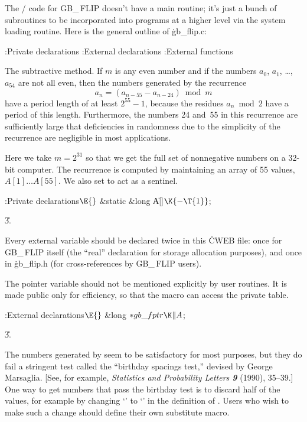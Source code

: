 The \CEE/ code for {\sc GB\_\,FLIP} doesn't have a main routine; it's just
a
bunch of subroutines to be incorporated into programs at a higher level
via the system loading routine. Here is the general outline of \.{gb\_flip.c}:

\Y\B{}:Private declarations\X\6
:External declarations\X\6
:External functions\X\par
\fi

The subtractive method. If $m$ is any even number and if the
numbers $a_0$, $a_1$, \dots,~$a_{54}$ are not all even, then the numbers
generated by the recurrence
$$ a_n=(a_{n-55}-a_{n-24})\bmod m $$
have a period length of at least $2^{55}-1$, because the residues
$a_n\bmod2$ have a period of this length. Furthermore, the numbers 24 and~55
in this recurrence are sufficiently large that deficiencies in randomness
due to the simplicity of the recurrence are negligible in most applications.

Here we take $m=2^{31}$ so that we get the full set of nonnegative numbers
on a 32-bit computer. The recurrence is computed by maintaining an array
of 55 values, $A[1]\ldots A[55]$. We also set  to
act as a sentinel.

\Y\B\4:Private declarations\X${}\E{}$\6
\&{static} \&{long} \|A[]${}\K\{{-}\T{1}\}{}$;%
\par
\U3.\fi

Every external variable should be declared twice in this \.{CWEB}
file: once for {\sc GB\_\,FLIP} itself (the ``real'' declaration for
storage allocation purposes), and once in \.{gb\_flip.h} (for
cross-references by {\sc GB\_\,FLIP} users).

The pointer variable  should not be mentioned explicitly
by user routines. It is made public only for efficiency, so that the
 macro can access the private  table.

\Y\B\4:External declarations\X${}\E{}$\6
\&{long} ${}{*}\\{gb\_fptr}\K\|A{}$;\par
\U3.\fi

The numbers generated by  seem to be
satisfactory for most
purposes, but they do fail a stringent test called the ``birthday spacings
test,'' devised by George Marsaglia. [See, for example, {\sl Statistics and
Probability Letters\/ \bf9} (1990), 35--39.] One way to get numbers that
pass the birthday test is to discard half of the values, for example
by changing `' to `'
in the definition of . Users who wish to make such a
change
should define their own substitute macro.

